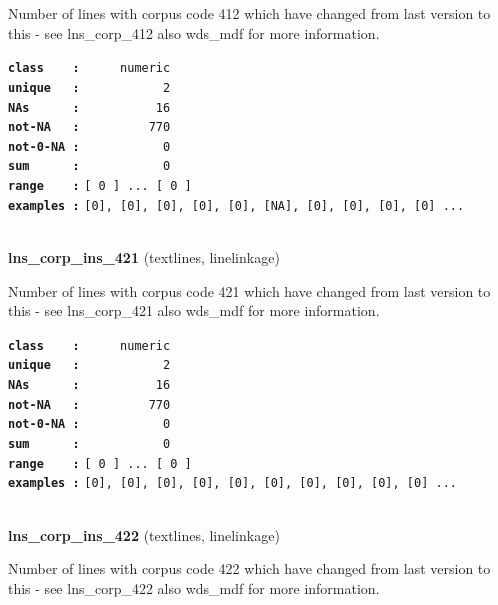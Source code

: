 \documentclass[]{article}
\begin{document}
Number of lines with corpus code 412 which have changed from last
version to this - see lns\_corp\_412 also wds\_mdf for more information.

\textbf{\texttt{class\ \ \ \ :}} \texttt{~~~~~numeric}\\
\textbf{\texttt{unique\ \ \ :}} \texttt{~~~~~~~~~~~2}\\
\textbf{\texttt{NAs\ \ \ \ \ \ :}} \texttt{~~~~~~~~~~16}\\
\textbf{\texttt{not-NA\ \ \ :}} \texttt{~~~~~~~~~770}\\
\textbf{\texttt{not-0-NA\ :}} \texttt{~~~~~~~~~~~0}\\
\textbf{\texttt{sum\ \ \ \ \ \ :}} \texttt{~~~~~~~~~~~0}\\
\textbf{\texttt{range\ \ \ \ :}}
\texttt{{[}\ 0\ {]}\ ...\ {[}\ 0\ {]}}\\
\textbf{\texttt{examples\ :}}
\texttt{{[}0{]},\ {[}0{]},\ {[}0{]},\ {[}0{]},\ {[}0{]},\ {[}NA{]},\ {[}0{]},\ {[}0{]},\ {[}0{]},\ {[}0{]}\ ...}\\

~

\textbf{lns\_corp\_ins\_421} (textlines, linelinkage)

Number of lines with corpus code 421 which have changed from last
version to this - see lns\_corp\_421 also wds\_mdf for more information.

\textbf{\texttt{class\ \ \ \ :}} \texttt{~~~~~numeric}\\
\textbf{\texttt{unique\ \ \ :}} \texttt{~~~~~~~~~~~2}\\
\textbf{\texttt{NAs\ \ \ \ \ \ :}} \texttt{~~~~~~~~~~16}\\
\textbf{\texttt{not-NA\ \ \ :}} \texttt{~~~~~~~~~770}\\
\textbf{\texttt{not-0-NA\ :}} \texttt{~~~~~~~~~~~0}\\
\textbf{\texttt{sum\ \ \ \ \ \ :}} \texttt{~~~~~~~~~~~0}\\
\textbf{\texttt{range\ \ \ \ :}}
\texttt{{[}\ 0\ {]}\ ...\ {[}\ 0\ {]}}\\
\textbf{\texttt{examples\ :}}
\texttt{{[}0{]},\ {[}0{]},\ {[}0{]},\ {[}0{]},\ {[}0{]},\ {[}0{]},\ {[}0{]},\ {[}0{]},\ {[}0{]},\ {[}0{]}\ ...}\\

~

\textbf{lns\_corp\_ins\_422} (textlines, linelinkage)

Number of lines with corpus code 422 which have changed from last
version to this - see lns\_corp\_422 also wds\_mdf for more information.
\end{document}
